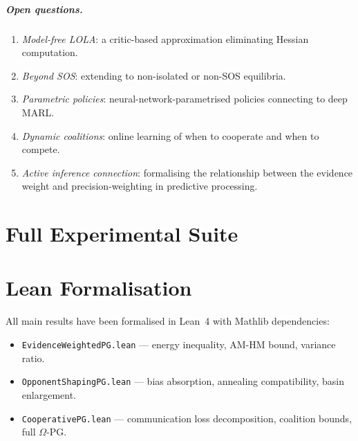 \documentclass[a4paper,oneside,11pt]{report}
\begin{document}
\paragraph{Open questions.}
\begin{enumerate}
    \item \emph{Model-free LOLA}: a critic-based approximation eliminating Hessian computation.
    \item \emph{Beyond SOS}: extending to non-isolated or non-SOS equilibria.
    \item \emph{Parametric policies}: neural-network-parametrised policies connecting to deep MARL.
    \item \emph{Dynamic coalitions}: online learning of when to cooperate and when to compete.
    \item \emph{Active inference connection}: formalising the relationship between the evidence weight and precision-weighting in predictive processing.
\end{enumerate}


\appendix





\chapter{Full Experimental Suite}
\label{app:sims}








\chapter{Lean Formalisation}
\label{app:lean}

All main results have been formalised in Lean~4 with Mathlib dependencies:
\begin{itemize}
    \item \texttt{EvidenceWeightedPG.lean} --- energy inequality, AM-HM bound, variance ratio.
    \item \texttt{OpponentShapingPG.lean} --- bias absorption, annealing compatibility, basin enlargement.
    \item \texttt{CooperativePG.lean} --- communication loss decomposition, coalition bounds, full $\Omega$-PG.
\end{itemize}
\end{document}
